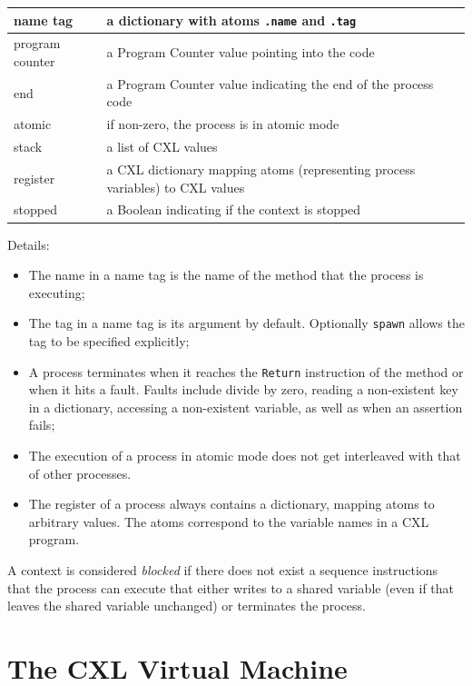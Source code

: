 \documentclass{report}
\begin{document}
\vspace{1em}
\begin{tabular}{|l|l|}
\hline
name tag & a dictionary with atoms \texttt{.name} and \texttt{.tag} \\
\hline
program counter & a Program Counter value pointing into the code \\
\hline
end & a Program Counter value indicating the end of the process code \\
\hline
atomic & if non-zero, the process is in atomic mode \\
\hline
stack & a list of CXL values \\
\hline
register & a CXL dictionary mapping atoms (representing process variables) to CXL values \\
\hline
stopped & a Boolean indicating if the context is stopped \\
\hline
\end{tabular}
\vspace{1em}

Details:
\begin{itemize}
\item The name in a name tag is the name of the method that the process
is executing;
\item The tag in a name tag is its argument by default.  Optionally
\texttt{spawn} allows the tag to be specified explicitly;
\item A process terminates when it reaches the \texttt{Return} instruction
of the method or when it hits a fault.  Faults include divide by zero,
reading a non-existent key in a dictionary, accessing a non-existent
variable, as well as when an assertion fails;
\item The execution of a process in atomic mode does not get interleaved
with that of other processes.
\item The register of a process always contains a dictionary, mapping
atoms to arbitrary values.  The atoms correspond to the variable names
in a CXL program.
\end{itemize}

A context is considered \emph{blocked}
if there does not exist a
sequence instructions that the process can execute that either writes
to a shared variable (even if that leaves the shared variable unchanged)
or terminates the process.

\chapter{The CXL Virtual Machine}
\end{document}
